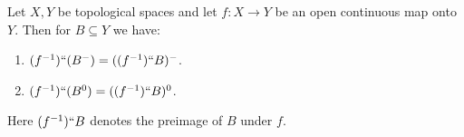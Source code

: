 Let $X, Y$ be topological spaces and let $f: X \rightarrow Y$ be an open continuous map onto $Y$. Then for $B \subseteq Y$ we have:
\begin{enumerate}
\item $(f^{-1})``(B^{-}) = ((f^{-1})``B)^{-}$.
\item $(f^{-1})``(B^{0}) = ((f^{-1})``B)^{0}$.
\end{enumerate}
Here $(f^{-1})``B$ denotes the preimage of $B$ under $f$.
